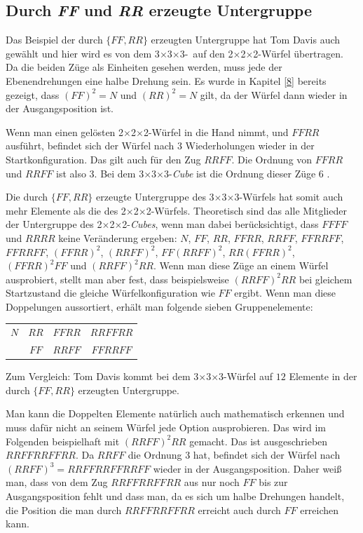 \documentclass[12pt,a4paper, usenames, dvipsnames]{article}
\theoremstyle{mystyle}
\theoremstyle{definition}
\newcommand{\Ttwo}{2$\times$2$\times$2-}
\newcommand{\Tthree}{3$\times$3$\times$3-}
\begin{document}
\subsection*{Durch \textit{FF} und \textit{RR} erzeugte Untergruppe}

Das Beispiel der durch $\{ FF, RR \}$ erzeugten Untergruppe hat Tom Davis auch gewählt \cite{TD} und hier wird es von dem \Tthree \ auf den \Ttwo Würfel übertragen.
Da die beiden Züge als Einheiten gesehen werden, muss jede der Ebenendrehungen eine halbe Drehung sein.
Es wurde in Kapitel \ref{8} bereits gezeigt, dass $(FF)^2 = N$ und $(RR)^2 = N$ gilt, da der Würfel dann wieder in der Ausgangsposition ist.

Wenn man einen gelösten \Ttwo Würfel in die Hand nimmt, und $FFRR$ ausführt, befindet sich der Würfel nach 3 Wiederholungen wieder in der Startkonfiguration. Das gilt auch für den Zug $RRFF$. Die Ordnung von $FFRR$ und $RRFF$ ist also 3. Bei dem \Tthree \textit{Cube} ist die Ordnung dieser Züge 6 \cite{TD}.

Die durch $\{ FF, RR \}$ erzeugte Untergruppe des \Tthree Würfels hat somit auch mehr Elemente als die des \Ttwo Würfels. Theoretisch sind das alle Mitglieder der Untergruppe des \Ttwo \textit{Cubes}, wenn man dabei berücksichtigt, dass $FFFF$ und $RRRR$ keine Veränderung ergeben: $N$, $FF$, $RR$, $FFRR$, $RRFF$, $FFRRFF$, $FFRRFF$, $(FFRR)^2$, $(RRFF)^2$, $FF(RRFF)^2$, $RR(FFRR)^2$, $(FFRR)^2FF$ und $(RRFF)^2RR$. 
Wenn man diese Züge an einem Würfel ausprobiert, stellt man aber fest, dass beispielsweise $(RRFF)^2RR$ bei gleichem Startzustand die gleiche Würfelkonfiguration wie $FF$ ergibt. Wenn man diese Doppelungen aussortiert, erhält man folgende sieben Gruppenelemente:
\begin{center}
\centering
\begin{tabular}{c c c c}
$N$ & $RR$ & $FFRR$ &  $RRFFRR$ \\
& $FF$ & $RRFF$ & $FFRRFF$   \\
\end{tabular}
\end{center}
Zum Vergleich: Tom Davis kommt bei dem  \Tthree Würfel auf $12$ Elemente in der durch $\{ FF, RR \}$ erzeugten Untergruppe.

Man kann die Doppelten Elemente natürlich auch mathematisch erkennen und muss dafür nicht an seinem Würfel jede Option ausprobieren.
Das wird im Folgenden beispielhaft mit $(RRFF)^2RR$ gemacht. Das ist ausgeschrieben $RRFFRRFFRR$. Da $RRFF$ die Ordnung 3 hat, befindet sich der Würfel nach $(RRFF)^3 = RRFFRRFFRRFF$ wieder in der Ausgangsposition. Daher weiß man, dass von dem Zug $RRFFRRFFRR$ aus nur noch $FF$ bis zur Ausgangsposition fehlt und dass man, da es sich um halbe Drehungen handelt, die Position die man durch $RRFFRRFFRR$ erreicht auch durch $FF$ erreichen kann.
\end{document}

